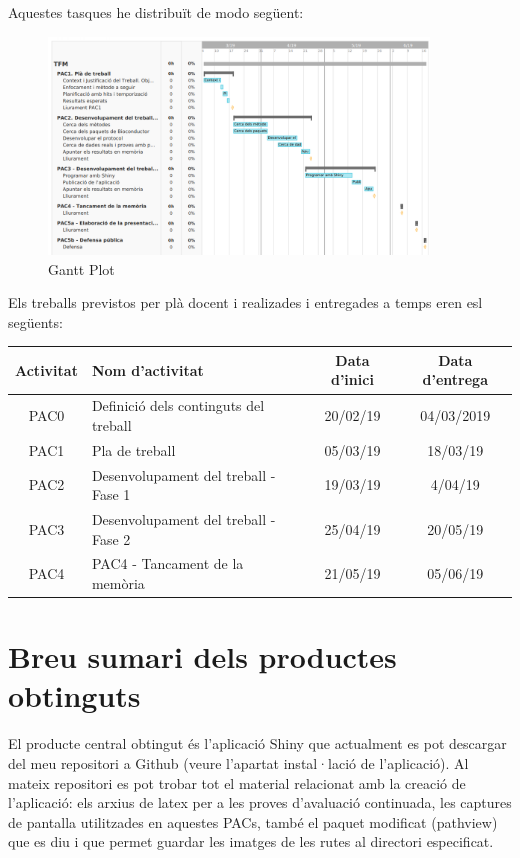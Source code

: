 Aquestes tasques he distribuït de modo següent: 

\begin{figure}[H]
\caption{Gantt Plot}
\centering
\includegraphics[width=0.9\textwidth]{figures/GanttPlot}
\end{figure}

Els treballs previstos per plà docent i realizades i entregades a temps eren esl següents: 

\begin{center}
 \begin{tabular}{||c | l | c | c||} 
 \hline
 Activitat & Nom d'activitat & Data d'inici & Data d'entrega  \\ [0.5ex] 
 \hline\hline
 PAC0 & Definició dels continguts del treball & 20/02/19 & 04/03/2019 \\ 
 \hline
 PAC1 & Pla de treball & 05/03/19 & 18/03/19 \\
 \hline
 PAC2 & Desenvolupament del treball - Fase 1 & 19/03/19 & 4/04/19 \\
 \hline
 PAC3 & Desenvolupament del treball - Fase 2 &  25/04/19 & 20/05/19 \\
 \hline
 PAC4 & PAC4 - Tancament de la memòria & 21/05/19 & 05/06/19 \\
 \hline
\end{tabular}
\end{center}

\section{Breu sumari dels productes obtinguts}

El producte central obtingut és l'aplicació Shiny que actualment es pot descargar del meu repositori a Github (veure l'apartat instal·lació de l'aplicació).  Al mateix repositori es pot trobar tot el material relacionat amb la creació de l'aplicació: els arxius de latex per a les proves d'avaluació continuada, les captures de pantalla utilitzades en aquestes PACs, també el paquet modificat \helvetica(pathview) que es diu  i que permet guardar les imatges de les rutes al directori especificat.

